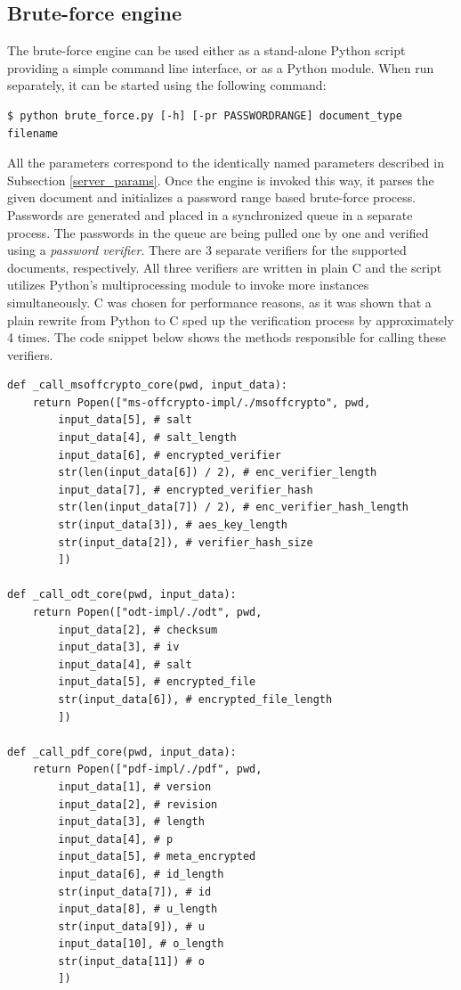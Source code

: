 \documentclass[11pt,oneside]{fithesis2}
\begin{document}
\subsection{Brute-force engine}\label{brute_force_engine}

The brute-force engine can be used either as a stand-alone Python script providing a simple command line interface, or as a Python module. When run separately, it can be started using the following command:

\begin{lstlisting}
$ python brute_force.py [-h] [-pr PASSWORDRANGE] document_type filename
\end{lstlisting}

All the parameters correspond to the identically named parameters described in Subsection \ref{server_params}. Once the engine is invoked this way, it parses the given document and initializes a password range based brute-force process. Passwords are generated and placed in a synchronized queue in a separate process. The passwords in the queue are being pulled one by one and verified using a \textit{password verifier}. There are 3 separate verifiers for the supported documents, respectively. All three verifiers are written in plain C and the script utilizes Python's multiprocessing module to invoke more instances simultaneously. C was chosen for performance reasons, as it was shown that a plain rewrite from Python to C sped up the verification process by approximately 4 times. The code snippet below shows the methods responsible for calling these verifiers.

\begin{lstlisting}
def _call_msoffcrypto_core(pwd, input_data):
    return Popen(["ms-offcrypto-impl/./msoffcrypto", pwd, 
        input_data[5], # salt
        input_data[4], # salt_length
        input_data[6], # encrypted_verifier
        str(len(input_data[6]) / 2), # enc_verifier_length
        input_data[7], # encrypted_verifier_hash
        str(len(input_data[7]) / 2), # enc_verifier_hash_length
        str(input_data[3]), # aes_key_length
        str(input_data[2]), # verifier_hash_size
        ])

def _call_odt_core(pwd, input_data):
    return Popen(["odt-impl/./odt", pwd, 
        input_data[2], # checksum
        input_data[3], # iv
        input_data[4], # salt
        input_data[5], # encrypted_file
        str(input_data[6]), # encrypted_file_length
        ]) 

def _call_pdf_core(pwd, input_data):
    return Popen(["pdf-impl/./pdf", pwd, 
        input_data[1], # version
        input_data[2], # revision
        input_data[3], # length
        input_data[4], # p
        input_data[5], # meta_encrypted 
        input_data[6], # id_length 
        str(input_data[7]), # id
        input_data[8], # u_length 
        str(input_data[9]), # u 
        input_data[10], # o_length
        str(input_data[11]) # o
        ]) 
\end{lstlisting}
\end{document}
